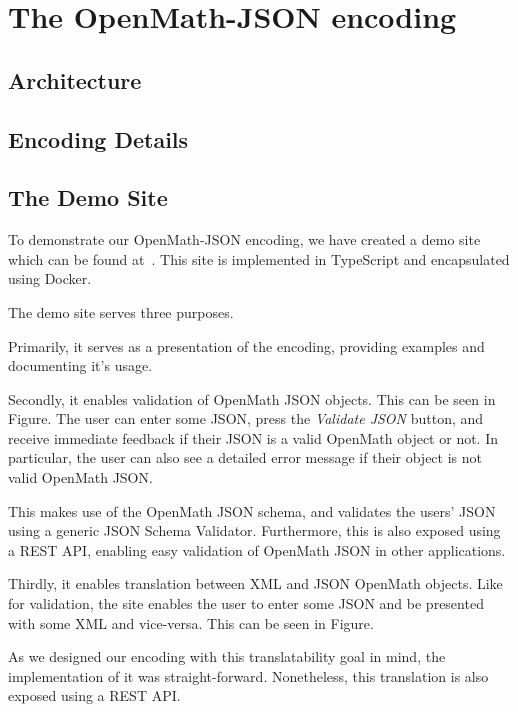 \section{The OpenMath-JSON encoding}

\subsection{Architecture}

\subsection{Encoding Details}

\subsection{The Demo Site}

To demonstrate our OpenMath-JSON encoding, we have created a demo site which can be found at~\cite{openmathjson:web}. 
This site is implemented in TypeScript and encapsulated using Docker. 

The demo site serves three purposes.

Primarily, it serves as a presentation of the encoding, providing examples and documenting it's usage. 

Secondly, it enables validation of OpenMath JSON objects. This can be seen in Figure.
The user can enter some JSON, press the \textit{Validate JSON} button, and receive immediate feedback if their JSON is a valid OpenMath object or not. 
In particular, the user can also see a detailed error message if their object is not valid OpenMath JSON. 

This makes use of the OpenMath JSON schema, and validates the users' JSON using a generic JSON Schema Validator. 
Furthermore, this is also exposed using a REST API, enabling easy validation of OpenMath JSON in other applications. 

Thirdly, it enables translation between XML and JSON OpenMath objects. 
Like for validation, the site enables the user to enter some JSON and be presented with some XML and vice-versa. 
This can be seen in Figure.

As we designed our encoding with this translatability goal in mind, the implementation of it was straight-forward. 
Nonetheless, this translation is also exposed using a REST API. 